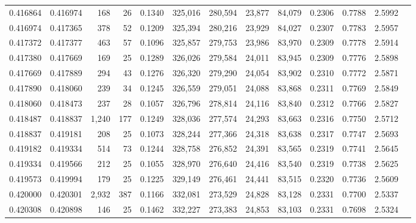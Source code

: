 \begin{tabular}{rrrrrrrrrrrrr}
0.416864 & 0.416974 &   168 &  26 &                                     0.1340 & 325,016 & 280,594 &  23,877 &  84,079 & 0.2306 & 0.7788 & 2.5992 \\
0.416974 & 0.417365 &   378 &  52 &                                     0.1209 & 325,394 & 280,216 &  23,929 &  84,027 & 0.2307 & 0.7783 & 2.5957 \\
0.417372 & 0.417377 &   463 &  57 &                                     0.1096 & 325,857 & 279,753 &  23,986 &  83,970 & 0.2309 & 0.7778 & 2.5914 \\
0.417380 & 0.417669 &   169 &  25 &                                     0.1289 & 326,026 & 279,584 &  24,011 &  83,945 & 0.2309 & 0.7776 & 2.5898 \\
0.417669 & 0.417889 &   294 &  43 &                                     0.1276 & 326,320 & 279,290 &  24,054 &  83,902 & 0.2310 & 0.7772 & 2.5871 \\
0.417890 & 0.418060 &   239 &  34 &                                     0.1245 & 326,559 & 279,051 &  24,088 &  83,868 & 0.2311 & 0.7769 & 2.5849 \\
0.418060 & 0.418473 &   237 &  28 &                                     0.1057 & 326,796 & 278,814 &  24,116 &  83,840 & 0.2312 & 0.7766 & 2.5827 \\
0.418487 & 0.418837 & 1,240 & 177 &                                     0.1249 & 328,036 & 277,574 &  24,293 &  83,663 & 0.2316 & 0.7750 & 2.5712 \\
0.418837 & 0.419181 &   208 &  25 &                                     0.1073 & 328,244 & 277,366 &  24,318 &  83,638 & 0.2317 & 0.7747 & 2.5693 \\
0.419182 & 0.419334 &   514 &  73 &                                     0.1244 & 328,758 & 276,852 &  24,391 &  83,565 & 0.2319 & 0.7741 & 2.5645 \\
0.419334 & 0.419566 &   212 &  25 &                                     0.1055 & 328,970 & 276,640 &  24,416 &  83,540 & 0.2319 & 0.7738 & 2.5625 \\
0.419573 & 0.419994 &   179 &  25 &                                     0.1225 & 329,149 & 276,461 &  24,441 &  83,515 & 0.2320 & 0.7736 & 2.5609 \\
0.420000 & 0.420301 & 2,932 & 387 &                                     0.1166 & 332,081 & 273,529 &  24,828 &  83,128 & 0.2331 & 0.7700 & 2.5337 \\
0.420308 & 0.420898 &   146 &  25 &                                     0.1462 & 332,227 & 273,383 &  24,853 &  83,103 & 0.2331 & 0.7698 & 2.5324 \\

\end{tabular}
